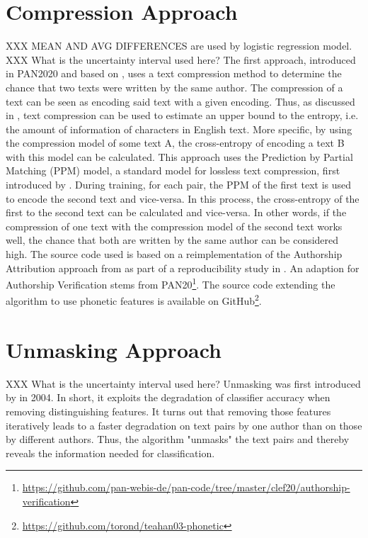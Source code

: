 \section{Compression Approach}\label{sec:compression-approach}
XXX MEAN AND AVG DIFFERENCES are used by logistic regression model.
XXX What is the uncertainty interval used here?
The first approach, introduced in PAN2020 and based on \cite{teahan2003compression}, uses a text compression method to determine the chance that two texts were written by the same author.
The compression of a text can be seen as encoding said text with a given encoding.
Thus, as discussed in \cite{brown1992upperBoundEntropy}, text compression can be used to estimate an upper bound to the entropy, i.e. the amount of information of characters in English text.
More specific, by using the compression model of some text A, the cross-entropy of encoding a text B with this model can be calculated.
This approach uses the Prediction by Partial Matching (PPM) model, a standard model for lossless text compression, first introduced by \cite{cleary1984PPM}.
During training, for each pair, the PPM of the first text is used to encode the second text and vice-versa.
In this process, the cross-entropy of the first to the second text can be calculated and vice-versa.
In other words, if the compression of one text with the compression model of the second text works well, the chance that both are written by the same author can be considered high.
The source code used is based on a reimplementation of the Authorship Attribution approach from \cite{teahan2003compression} as part of a reproducibility study in \cite{potthast2016reimplementation}.
An adaption for Authorship Verification stems from PAN20\footnote{\url{https://github.com/pan-webis-de/pan-code/tree/master/clef20/authorship-verification}}.
The source code extending the algorithm to use phonetic features is available on GitHub\footnote{\url{https://github.com/torond/teahan03-phonetic}}.

\section{Unmasking Approach}\label{sec:unmasking-approach}
XXX What is the uncertainty interval used here?
Unmasking was first introduced by \cite{koppel2004unmasking} in 2004.
In short, it exploits the degradation of classifier accuracy when removing distinguishing features.
It turns out that removing those features iteratively leads to a faster degradation on text pairs by one author than on those by different authors.
Thus, the algorithm "unmasks" the text pairs and thereby reveals the information needed for classification.\\

